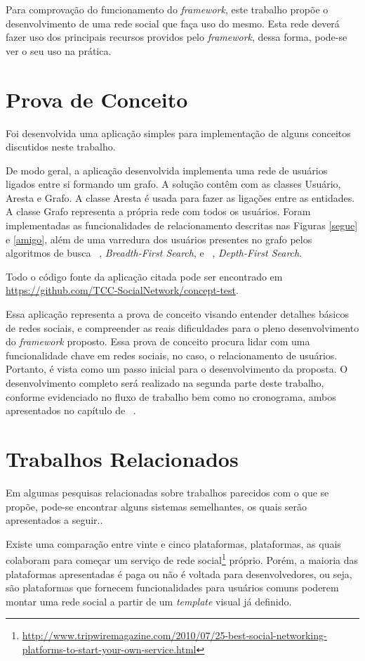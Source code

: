 Para comprovação do funcionamento do \textit{framework}, este trabalho propõe o desenvolvimento de uma rede social que faça uso do mesmo. Esta rede deverá fazer uso dos principais recursos providos pelo \textit{framework}, dessa forma, pode-se ver o seu uso na prática.

\section{Prova de Conceito}

Foi desenvolvida uma aplicação simples para implementação de alguns conceitos discutidos neste trabalho.

De modo geral, a aplicação desenvolvida implementa uma rede de usuários ligados entre si formando um grafo. A solução contêm com as classes Usuário, Aresta e Grafo. A classe Aresta é usada para fazer as ligações entre as entidades. A classe Grafo representa a própria rede com todos os usuários. Foram implementadas as funcionalidades de relacionamento descritas nas Figuras \ref{segue} e \ref{amigo}, além de uma varredura dos usuários presentes no grafo pelos algoritmos de busca ~, \textit{Breadth-First Search}, e ~, \textit{Depth-First Search}.

Todo o código fonte da aplicação citada pode ser encontrado em \url{https://github.com/TCC-SocialNetwork/concept-test}.

Essa aplicação representa a prova de conceito visando entender detalhes básicos de redes sociais, e compreender as reais dificuldades para o pleno desenvolvimento do \textit{framework} proposto. Essa prova de conceito procura lidar com uma funcionalidade chave em redes sociais, no caso, o relacionamento de usuários. Portanto, é vista como um passo inicial para o desenvolvimento da proposta. O desenvolvimento completo será realizado na segunda parte deste trabalho, conforme evidenciado no fluxo de trabalho bem como no cronograma, ambos apresentados no capítulo de ~.

\section{Trabalhos Relacionados}

Em algumas pesquisas relacionadas sobre trabalhos parecidos com o que se propõe, pode-se encontrar alguns sistemas semelhantes, os quais serão apresentados a seguir..

Existe uma comparação entre vinte e cinco plataformas, plataformas, as quais colaboram para começar um serviço de rede social\footnote{\url{http://www.tripwiremagazine.com/2010/07/25-best-social-networking-platforms-to-start-your-own-service.html}}  próprio. Porém, a  maioria das plataformas apresentadas é paga ou não é voltada para desenvolvedores, ou seja, são plataformas que fornecem funcionalidades para usuários comuns poderem montar uma rede social a partir de um \textit{template} visual já definido.

